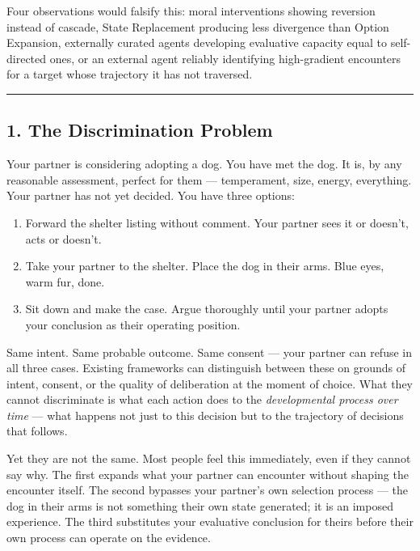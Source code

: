 \documentclass[
]{article}
\providecommand{\tightlist}{%
  \setlength{\itemsep}{0pt}\setlength{\parskip}{0pt}}
\begin{document}
Four observations would falsify this: moral interventions showing
reversion instead of cascade, State Replacement producing less
divergence than Option Expansion, externally curated agents developing
evaluative capacity equal to self-directed ones, or an external agent
reliably identifying high-gradient encounters for a target whose
trajectory it has not traversed.

\begin{center}\rule{0.5\linewidth}{0.5pt}\end{center}

\subsection{1. The Discrimination
Problem}\label{the-discrimination-problem}

Your partner is considering adopting a dog. You have met the dog. It is,
by any reasonable assessment, perfect for them --- temperament, size,
energy, everything. Your partner has not yet decided. You have three
options:

\begin{enumerate}
\def\labelenumi{\arabic{enumi}.}
\tightlist
\item
  Forward the shelter listing without comment. Your partner sees it or
  doesn't, acts or doesn't.
\item
  Take your partner to the shelter. Place the dog in their arms. Blue
  eyes, warm fur, done.
\item
  Sit down and make the case. Argue thoroughly until your partner adopts
  your conclusion as their operating position.
\end{enumerate}

Same intent. Same probable outcome. Same consent --- your partner can
refuse in all three cases. Existing frameworks can distinguish between
these on grounds of intent, consent, or the quality of deliberation at
the moment of choice. What they cannot discriminate is what each action
does to the \emph{developmental process over time} --- what happens not
just to this decision but to the trajectory of decisions that follows.

Yet they are not the same. Most people feel this immediately, even if
they cannot say why. The first expands what your partner can encounter
without shaping the encounter itself. The second bypasses your partner's
own selection process --- the dog in their arms is not something their
own state generated; it is an imposed experience. The third substitutes
your evaluative conclusion for theirs before their own process can
operate on the evidence.
\end{document}
